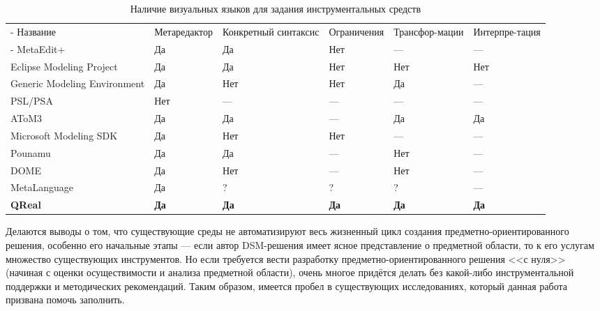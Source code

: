 \begin{table}[ht]
\begin{small}
	\begin{longtabu} {| X[1 l p] | X[1 l p] | X[1 l p] | X[1 l p] | X[1 l p] | X[1 l p] |}
		\caption{Наличие визуальных языков для задания инструментальных средств} \\
		\tabucline-
		 Название                    & Метаредактор & Конкретный синтаксис & Ограничения & Трансфор-мации & Интерпре-тация \\
		\tabucline-
		\everyrow{\tabucline-}
		MetaEdit+                    & Да           & Да                   & Нет         & ---           & ---           \\
		Eclipse Modeling Project     & Да           & Да                   & Нет         & Нет           & Нет           \\
		Generic Modeling Environment & Да           & Нет                  & Нет         & Да            & ---           \\
		PSL/PSA                      & Нет          & ---                  & ---         & ---           & ---           \\
		AToM3                        & Да           & Да                   & ---         & Да            & Да            \\
		Microsoft Modeling SDK       & Да           & Нет                  & Нет         & ---           & ---           \\
		Pounamu                      & Да           & Да                   & ---         & Нет           & ---           \\
		DOME                         & Да           & Нет                  & ---         & Нет           & ---           \\
		MetaLanguage                 & Да           & ?                    & ?           & ?             & ---           \\
		\textbf{QReal}               & \textbf{Да}  & \textbf{Да}          & \textbf{Да} & \textbf{Да}   & \textbf{Да}
		\label{tab:existingPlatformsCondensed}
	\end{longtabu}
\end{small}
\end{table}

Делаются выводы о том, что существующие среды не автоматизируют весь жизненный цикл
создания предметно-ориентированного решения, особенно его начальные этапы --- если автор DSM-решения 
имеет ясное представление о предметной области, то к его услугам множество существующих инструментов. 
Но если требуется вести разработку предметно-ориентированного решения <<с нуля>> (начиная 
с оценки осуществимости и анализа предметной области), очень многое придётся делать 
без какой-либо инструментальной поддержки и методических рекомендаций.
Таким образом, имеется пробел в существующих исследованиях, который данная работа
призвана помочь заполнить.

